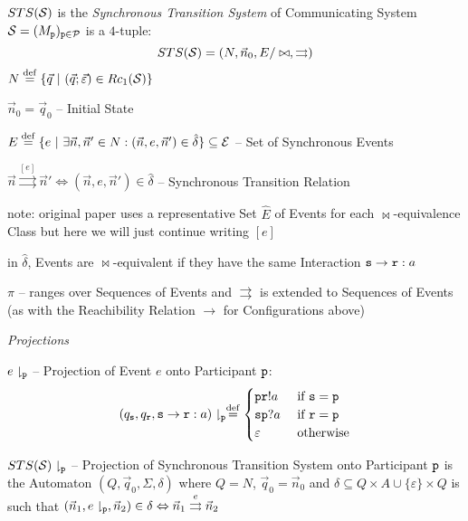 $STS(\mathcal{S})$ is the \emph{Synchronous Transition System} of
Communicating System $\mathcal{S} =
(M_\mathtt{p})_{\mathtt{p}\in\mathcal{P}}$ is a $4$-tuple:
\[
  STS(\mathcal{S}) = (N,\vec{n}_0,E/\bowtie,\rightrightarrows)
\]
$N \defeq \{ \vec{q} \ |\ (\vec{q};\vec{\varepsilon}) \in
Rc_1(\class{S}) \}$ %

$\vec{n}_0 = \vec{q}_0$ -- Initial State

$E \stackrel{\mathrm{def}}= \{ e \ |\ \exists\vec{n},\vec{n}' \in N :
  (\vec{n},e,\vec{n}') \in \hat{\delta} \} \subseteq \mathcal{E}$
-- Set of Synchronous Events %

$\vec{n} \stackrel{[e]}{\rightrightarrows} \vec{n}'
  \Longleftrightarrow (\vec{n},e,\vec{n}') \in \hat{\delta}$ --
Synchronous Transition Relation %

note: original paper uses a representative Set $\hat{E}$ of Events for
each $\bowtie$-equivalence Class but here we will just continue
writing $[e]$

in $\hat{\delta}$, Events are $\bowtie$-equivalent if they have the
same Interaction $\mathtt{s}\rightarrow\mathtt{r} : a$

$\pi$ -- ranges over Sequences of Events and $\rightrightarrows$ is
extended to Sequences of Events (as with the Reachibility Relation
$\rightarrow$ for Configurations above)


\emph{Projections}

$e\downharpoonright_\mathtt{p}$ -- Projection of Event $e$ onto
Participant $\mathtt{p}$:
\[
  (q_\mathtt{s},q_\mathtt{r},\mathtt{s}\rightarrow\mathtt{r}:a)
    \downharpoonright_\mathtt{p}
  \stackrel{\mathrm{def}}= \begin{cases}
    \mathtt{pr}!a &\ \text{if}\ \mathtt{s = p} \\
    \mathtt{sp}?a &\ \text{if}\ \mathtt{r = p} \\
    \varepsilon  &\ \text{otherwise} \\
  \end{cases}
\]

$STS(\mathcal{S})\downharpoonright_\mathtt{p}$ -- Projection of
Synchronous Transition System onto Participant $\mathtt{p}$ is the
Automaton $(Q, \vec{q}_0, \Sigma, \delta)$ where $Q = N$, $\vec{q}_0 =
\vec{n}_0$ and $\delta \subseteq Q \times A \cup \{\varepsilon\}
\times Q$ is such that $(\vec{n}_1, e\downharpoonright_\mathtt{p},
\vec{n}_2) \in \delta \Leftrightarrow \vec{n}_1
\stackrel{e}{\rightrightarrows} \vec{n}_2$


